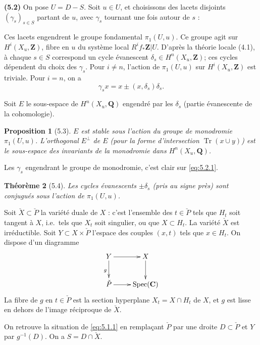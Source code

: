 \documentclass[12pt,a4paper]{amsart}
\theoremstyle{plain}
\newtheorem{theoreme}{Th\'eor\`eme}[section]
\newtheorem{proposition}[theoreme]{Proposition}
\theoremstyle{definition}
\theoremstyle{remark}
\DeclareMathOperator{\Tr}{Tr}
\DeclareMathOperator{\Spec}{Spec}
\newcommand{\Q}{\mathbf{Q}}
\newcommand{\Z}{\mathbf{Z}}
\newcommand{\C}{\mathbf{C}}
\numberwithin{equation}{section}
\begin{document}
\noindent \textbf{(5.2)} On pose $U=D-S$. Soit $u\in U$, et choisissons des lacets disjoints $(\gamma_s)_{s\in S}$ partant de $u$, avec $\gamma_s$ tournant une fois autour de $s$ :

Ces lacets engendrent le groupe fondamental $\pi_1(U,u)$. Ce groupe agit sur $H^i(X_u,\Z)$, fibre en $u$ du syst\`eme local $R^i f_\ast\Z|U$. D'apr\`es la th\'eorie locale (4.1), \`a chaque $s\in S$ correspond un cycle \'evanescent $\delta_s\in H^n(X_u,\Z)$; ces cycles d\'ependent du choix des $\gamma_s$. Pour $i\not=n$, l'action de $\pi_1(U,u)$ sur $H^i(X_u,\Z)$ est triviale. Pour $i=n$, on a
\begin{equation}\label{eq:5.2.1}
\gamma_s x = x \pm (x,\delta_s)\delta_s.
\end{equation}

Soit $E$ le sous-espace de $H^n(X_u,\Q)$ engendr\'e par les $\delta_s$ (partie \'evanescente de la cohomologie).

\begin{proposition}[5.3]\label{prop:5.3}
$E$ est stable sous l'action du groupe de monodromie $\pi_1(U,u)$. L'orthogonal $E^\perp$ de $E$ (pour la forme d'intersection $\Tr(x\cup y)$) est le sous-espace des invariants de la monodromie dans $H^n(X_u,\Q)$.
\end{proposition}

Les $\gamma_s$ engendrant le groupe de monodromie, c'est clair sur \eqref{eq:5.2.1}.

\begin{theoreme}[5.4]\label{thm:5.4}
Les cycles \'evanescents $\pm\delta_s$ (pris au signe pr\`es) sont conjugu\'es sous l'action de $\pi_1(U,u)$.
\end{theoreme}

Soit $\check{X}\subset\check{P}$ la vari\'et\'e duale de $X$ : c'est l'ensemble des $t\in\check{P}$ tels que $H_t$ soit tangent \`a $X$, i.e.\ tels que $X_t$ soit singulier, ou que $X\subset H_t$. La vari\'et\'e $\check{X}$ est irr\'eductible. Soit $Y\subset X\times\check{P}$ l'espace des couples $(x,t)$ tels que $x\in H_t$. On dispose d'un diagramme
\[
\xymatrix{
Y \ar[r] \ar[d]_g & X \ar[d] \\
\check{P} \ar[r] & \Spec(\C)
}
\]
La fibre de $g$ en $t\in\check{P}$ est la section hyperplane $X_t=X\cap H_t$ de $X$, et $g$ est lisse en dehors de l'image r\'eciproque de $\check{X}$.

On retrouve la situation de \eqref{eq:5.1.1} en rempla\c{c}ant $\check{P}$ par une droite $D\subset\check{P}$ et $Y$ par $g^{-1}(D)$. On a $S=D\cap\check{X}$.
\end{document}
